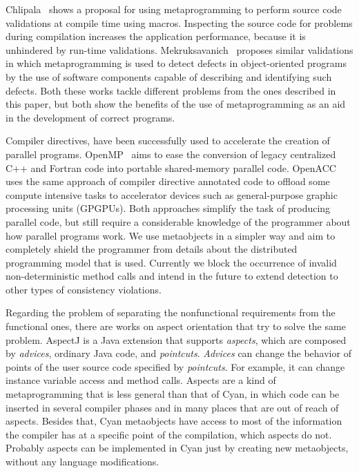 \documentclass[preprint,review]{elsarticle}
\begin{document}
Chlipala~\cite{chlipala2013bedrock}   shows  a   proposal  for   using
metaprogramming  to perform  source code  validations at  compile time
using  macros.   Inspecting  the   source  code  for  problems  during
compilation  increases  the  application performance,  because  it  is
unhindered             by            run-time             validations.
Mekruksavanich~\cite{mekruksavanich2012analytical}   proposes  similar
validations  in which  metaprogramming is  used to  detect defects  in
object-oriented programs by the use  of software components capable of
describing and identifying such defects.  Both these works tackle different
problems from  the ones  described in  this paper,  but both  show the
benefits of the use of metaprogramming as an aid in the development of
correct programs.

Compiler  directives, have  been successfully  used to  accelerate the
creation of  parallel programs. OpenMP~\cite{dagum1998openmp}  aims to
ease the  conversion of legacy  centralized C++ and Fortran  code into
portable shared-memory parallel code. OpenACC~\cite{wienke2012openacc}
uses the same approach of compiler directive annotated code to offload
some  compute   intensive  tasks   to  accelerator  devices   such  as
general-purpose  graphic processing  units (GPGPUs).   Both approaches
simplify  the task  of producing  parallel code,  but still  require a
considerable knowledge  of the programmer about  how parallel programs
work. We  use metaobjects in a  simpler way and  aim to completely
shield  the programmer  from  details about  the distributed  programming
model that is used.  Currently we block the occurrence of invalid
non-deterministic   method  calls   and  intend   in  the   future  to
extend detection to other types of consistency violations.

Regarding  the problem  of separating  the nonfunctional  requirements
from the functional  ones, there are works on  aspect orientation that
try to solve the same  problem. AspectJ \cite{kiczales01overview} is a
Java extension  that supports \textit{aspects}, which  are composed by
\textit{advices},        ordinary         Java        code,        and
\textit{pointcuts}. \textit{Advices} can change the behavior of points
of the user source code specified by \textit{pointcuts}.  For example,
it can change instance variable access and method calls. Aspects are a
kind of  metaprogramming that is  less general  than that of  Cyan, in
which code  can be  inserted in  several compiler  phases and  in many
places  that  are  out  of  reach  of  aspects.   Besides  that,  Cyan
metaobjects have access to most of the information the compiler has at
a specific point  of the compilation, which aspects  do not.  Probably
aspects can be  implemented in Cyan just by  creating new metaobjects,
without any language modifications.
\end{document}
